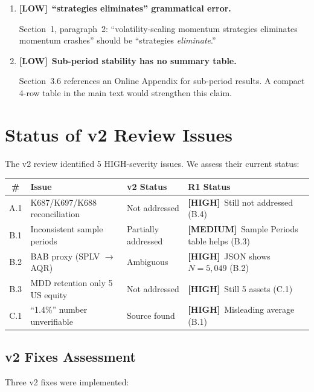 \documentclass[12pt,a4paper]{article}
\newcommand{\HIGH}{\textcolor{highsev}{\textbf{[HIGH]}}}
\newcommand{\MEDIUM}{\textcolor{medsev}{\textbf{[MEDIUM]}}}
\newcommand{\LOW}{\textcolor{lowsev}{\textbf{[LOW]}}}
\begin{document}
\begin{enumerate}[label=\textbf{E.\arabic*}]
\item \LOW\ \textbf{``strategies eliminates'' grammatical error.}

Section~1, paragraph~2: ``volatility-scaling momentum strategies eliminates momentum crashes'' should be ``strategies \textit{eliminate}.''


\item \LOW\ \textbf{Sub-period stability has no summary table.}

Section~3.6 references an Online Appendix for sub-period results. A compact 4-row table in the main text would strengthen this claim.

\end{enumerate}


\section{Status of v2 Review Issues}
\label{sec:v2_status}

The v2 review identified 5 HIGH-severity issues. We assess their current status:

\begin{center}
\small
\begin{tabular}{clll}
\toprule
\# & Issue & v2 Status & R1 Status \\
\midrule
A.1 & K687/K697/K688 reconciliation & Not addressed & \HIGH\ Still not addressed (B.4) \\
B.1 & Inconsistent sample periods & Partially addressed & \MEDIUM\ Sample Periods table helps (B.3) \\
B.2 & BAB proxy (SPLV $\to$ AQR) & Ambiguous & \HIGH\ JSON shows $N = 5{,}049$ (B.2) \\
B.3 & MDD retention only 5 US equity & Not addressed & \HIGH\ Still 5 assets (C.1) \\
C.1 & ``1.4\%'' number unverifiable & Source found & \HIGH\ Misleading average (B.1) \\
\bottomrule
\end{tabular}
\end{center}

\subsection{v2 Fixes Assessment}

Three v2 fixes were implemented:
\end{document}
